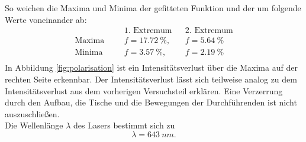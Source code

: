 So weichen die Maxima und Minima der gefitteten Funktion und der um folgende Werte voneinander ab:
\begin{align*}
              &&& \text{1. Extremum}  && \text{2. Extremum}    \\
\text{Maxima} &&& f=\SI{17.72}{\%},   && f=\SI{5.64}{\%} \\
\text{Minima} &&& f=\SI{3.57}{\%},    && f=\SI{2.19}{\%} \\
\end{align*}
In Abbildung \ref{fig:polarisation} ist ein Intensitätsverlust über die Maxima auf der rechten Seite erkennbar.
Der Intensitätsverlust lässt sich teilweise analog zu dem Intensitätsverlust aus dem vorherigen Versuchsteil erklären.
Eine Verzerrung durch den Aufbau, die Tische und die Bewegungen der Durchführenden ist nicht auszuschließen.\\
Die Wellenlänge $\lambda$ des Lasers bestimmt sich zu
\begin{equation*}
  \lambda=\SI{643}{nm}.
\end{equation*}

